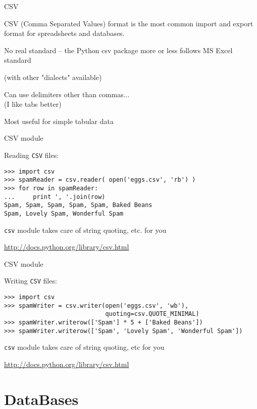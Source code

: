 \documentclass{beamer}
\begin{document}
\begin{frame}[fragile]{CSV}

{\Large CSV (Comma Separated Values) format is the
most common import and export format for spreadsheets and databases.}

\vfill
{\Large No real standard -- the Python csv package more or less follows MS Excel standard}

(with other "dialects" available)

\vfill
{\Large Can use delimiters other than commas...}\\
(I like tabs better)

\vfill
{\Large Most useful for simple tabular data}

\end{frame}

\begin{frame}[fragile]{CSV module}

{\Large Reading \verb|CSV| files:}

\begin{verbatim}
>>> import csv
>>> spamReader = csv.reader( open('eggs.csv', 'rb') )
>>> for row in spamReader:
...     print ', '.join(row)
Spam, Spam, Spam, Spam, Spam, Baked Beans
Spam, Lovely Spam, Wonderful Spam
\end{verbatim}

\vfill
{\verb|csv| module takes care of string quoting, etc. for you}

\vfill
\url{http://docs.python.org/library/csv.html}
\end{frame}



\begin{frame}[fragile]{CSV module}

{\Large Writing \verb|CSV| files:}

\begin{verbatim}
>>> import csv
>>> spamWriter = csv.writer(open('eggs.csv', 'wb'), 
                            quoting=csv.QUOTE_MINIMAL)
>>> spamWriter.writerow(['Spam'] * 5 + ['Baked Beans'])
>>> spamWriter.writerow(['Spam', 'Lovely Spam', 'Wonderful Spam'])
\end{verbatim}

\vfill
{\verb|csv| module takes care of string quoting, etc for you}

\vfill
\url{http://docs.python.org/library/csv.html}
\end{frame}




\section{DataBases} 
\end{document}
